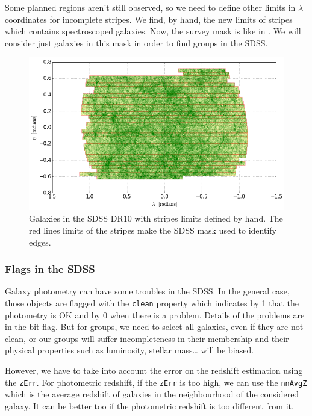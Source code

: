 Some planned regions aren't still observed, so we need to define other limits
in $\lambda$ coordinates for incomplete stripes. We find, by hand, the new
limits of stripes which contains spectroscoped galaxies. Now, the survey mask
is like in . We will consider just galaxies in this mask in
order to find groups in the SDSS\@.
%
\begin{figure}[ht] \centering
    \includegraphics[width=\linewidth]{figures/sdss/sdss.png}
    \caption{Galaxies in the SDSS DR10 with stripes limits defined by hand. The
    red lines limits of the stripes make the SDSS mask used to identify
edges.\label{fig:sdss}}
\end{figure}

\subsubsection{Flags in the SDSS}

Galaxy photometry can have some troubles in the SDSS\@. In the general case,
those objects are flagged with the \texttt{clean} property which indicates by 1
that the photometry is OK and by 0 when there is a problem. Details of the
problems are in the bit flag. But for groups, we need to select all galaxies,
even if they are not clean, or our groups will suffer incompleteness in their
membership and their physical properties such as luminosity, stellar mass\ldots
will be biased.

However, we have to take into account the error on the redshift estimation
using the \texttt{zErr}. For photometric redshift, if the \texttt{zErr} is too
high, we can use the \texttt{nnAvgZ} which is the average redshift of galaxies
in the neighbourhood of the considered galaxy. It can be better too if the
photometric redshift is too different from it.

